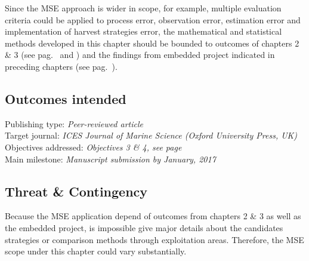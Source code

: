 Since the MSE approach is wider in scope, for example, multiple evaluation criteria could be applied to process error, observation error, estimation error and implementation of harvest strategies error, the mathematical and statistical methods developed in this chapter should be bounded to outcomes of chapters 2 \& 3 (see pag.~\pageref{sec:chapter2} and \pageref{sec:chapter3}) and the findings from embedded project indicated in preceding chapters (see pag.~\pageref{subsec:extsupp}).


\subsection*{Outcomes intended}

Publishing type: \textit{Peer-reviewed article} \\
Target journal: \textit{ICES Journal of Marine Science (Oxford University Press, UK)} \\
Objectives addressed: \textit{Objectives 3 \& 4, see page~\pageref{subsec:objetives} }\\
Main milestone: \textit{Manuscript submission by January,  2017}


\subsection*{Threat \& Contingency}

Because the MSE application depend of outcomes from chapters 2 \& 3 as well as the embedded project, is impossible give major details about the candidates strategies or comparison methods through exploitation areas. Therefore, the MSE scope under this chapter could vary substantially.   


\vspace{1.8cm}
